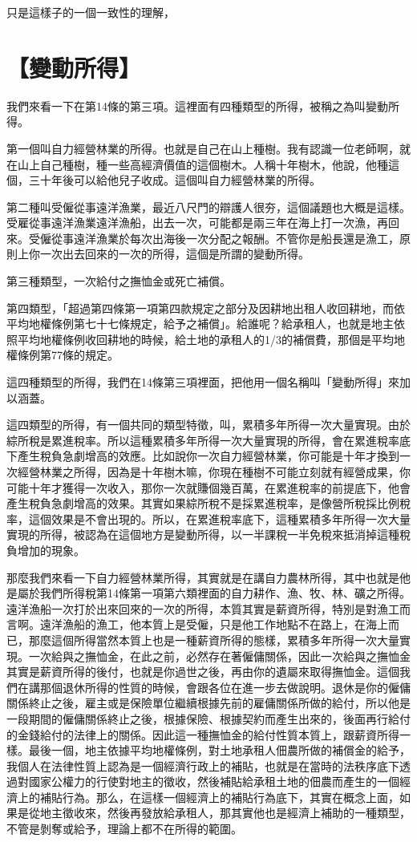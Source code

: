 \documentclass[]{ctexbook}
\begin{document}
只是這樣子的一個一致性的理解，

\hypertarget{ux8b8aux52d5ux6240ux5f97}{%
\section{【變動所得】}\label{ux8b8aux52d5ux6240ux5f97}}

我們來看一下在第14條的第三項。這裡面有四種類型的所得，被稱之為叫變動所得。

第一個叫自力經營林業的所得。也就是自己在山上種樹。我有認識一位老師啊，就在山上自己種樹，種一些高經濟價值的這個樹木。人稱十年樹木，他說，他種這個，三十年後可以給他兒子收成。這個叫自力經營林業的所得。

第二種叫受僱從事遠洋漁業，最近八尺門的辯護人很夯，這個議題也大概是這樣。受雇從事遠洋漁業遠洋漁船，出去一次，可能都是兩三年在海上打一次漁，再回來。受僱從事遠洋漁業於每次出海後一次分配之報酬。不管你是船長還是漁工，原則上你一次出去回來的一次的所得，這個是所謂的變動所得。

第三種類型，一次給付之撫恤金或死亡補償。

第四類型，「超過第四條第一項第四款規定之部分及因耕地出租人收回耕地，而依平均地權條例第七十七條規定，給予之補償」。給誰呢？給承租人，也就是地主依照平均地權條例收回耕地的時候，給土地的承租人的1/3的補償費，那個是平均地權條例第77條的規定。

這四種類型的所得，我們在14條第三項裡面，把他用一個名稱叫「變動所得」來加以涵蓋。

這四類型的所得，有一個共同的類型特徵，叫，累積多年所得一次大量實現。由於綜所稅是累進稅率。所以這種累積多年所得一次大量實現的所得，會在累進稅率底下產生稅負急劇增高的效應。比如說你一次自力經營林業，你可能是十年才換到一次經營林業之所得，因為是十年樹木嘛，你現在種樹不可能立刻就有經營成果，你可能十年才獲得一次收入，那你一次就賺個幾百萬，在累進稅率的前提底下，他會產生稅負急劇增高的效果。其實如果綜所稅不是採累進稅率，是像營所稅採比例稅率，這個效果是不會出現的。所以，在累進稅率底下，這種累積多年所得一次大量實現的所得，被認為在這個地方是變動所得，以一半課稅一半免稅來抵消掉這種稅負增加的現象。

那麼我們來看一下自力經營林業所得，其實就是在講自力農林所得，其中也就是他是屬於我們所得稅第14條第一項第六類裡面的自力耕作、漁、牧、林、礦之所得。遠洋漁船一次打於出來回來的一次的所得，本質其實是薪資所得，特別是對漁工而言啊。遠洋漁船的漁工，他本質上是受僱，只是他工作地點不在路上，在海上而已，那麼這個所得當然本質上也是一種薪資所得的態樣，累積多年所得一次大量實現。一次給與之撫恤金，在此之前，必然存在著僱傭關係，因此一次給與之撫恤金其實是薪資所得的後付，也就是你過世之後，再由你的遺屬來取得撫恤金。這個我們在講那個退休所得的性質的時候，會跟各位在進一步去做說明。退休是你的僱傭關係終止之後，雇主或是保險單位繼續根據先前的雇傭關係所做的給付，所以他是一段期間的僱傭關係終止之後，根據保險、根據契約而產生出來的，後面再行給付的金錢給付的法律上的關係。因此這一種撫恤金的給付性質本質上，跟薪資所得一樣。最後一個，地主依據平均地權條例，對土地承租人佃農所做的補償金的給予，我個人在法律性質上認為是一個經濟行政上的補貼，也就是在當時的法秩序底下透過對國家公權力的行使對地主的徵收，然後補貼給承租土地的佃農而產生的一個經濟上的補貼行為。那么，在這樣一個經濟上的補貼行為底下，其實在概念上面，如果是從地主徵收來，然後再發放給承租人，那其實他也是經濟上補助的一種類型，不管是剝奪或給予，理論上都不在所得的範圍。
\end{document}

